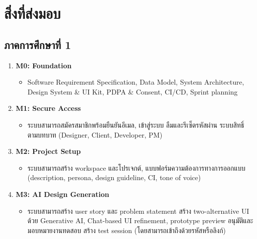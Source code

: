 \section{สิ่งที่ส่งมอบ}
\subsection{ภาคการศึกษาที่ 1}
\begin{enumerate}
  \item \textbf{M0: Foundation}
    \begin{itemize}
      \item Software Requirement Specification, Data Model, System Architecture, Design System \& UI Kit, PDPA \& Consent, CI/CD, Sprint planning
    \end{itemize}
  \item \textbf{M1: Secure Access}
    \begin{itemize}
      \item ระบบสามารถสมัครสมาชิกพร้อมยืนยันอีเมล, เข้าสู่ระบบ ลืมและรีเซ็ตรหัสผ่าน ระบบสิทธิ์ตามบทบาท (Designer, Client, Developer, PM)
    \end{itemize}
  \item \textbf{M2: Project Setup}
    \begin{itemize}
      \item ระบบสามารถสร้าง workspace และโปรเจกต์, แบบฟอร์มความต้องการทางการออกแบบ (description, persona, design guideline, CI, tone of voice)
    \end{itemize}
  \item \textbf{M3: AI Design Generation}
    \begin{itemize}
      \item ระบบสามารถสร้าง user story และ problem statement สร้าง two-alternative UI ด้วย Generative AI, Chat-based UI refinement, prototype preview อนุมัติและมอบหมายงานทดสอบ สร้าง test session (โดยสามารถเข้าถึงด้วยรหัสหรือลิงก์)
    \end{itemize}
\end{enumerate}

